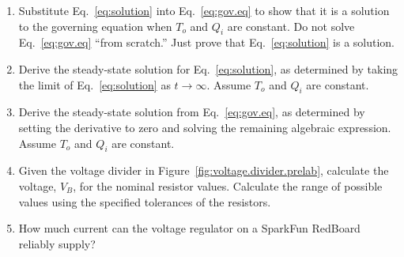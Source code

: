 \documentclass[11pt]{article} %
\begin{document}
\begin{enumerate}
\item Substitute Eq.~\ref{eq:solution} into Eq.~\ref{eq:gov.eq} to show that it is a solution to the governing equation when $T_{o}$ and $Q_{i}$ are constant. Do not solve Eq.~\ref{eq:gov.eq} ``from scratch.'' Just prove that Eq.~\ref{eq:solution} is a solution.
\vspace{1.5in}
\item Derive the steady-state solution for Eq.~\ref{eq:solution}, as determined by taking the limit of Eq.~\ref{eq:solution} as $t\rightarrow\infty$. Assume $T_{o}$ and $Q_{i}$ are constant.
\vspace{1.5in}
\item Derive the steady-state solution from Eq.~\ref{eq:gov.eq}, as determined by setting the derivative to zero and solving the remaining algebraic expression. Assume $T_{o}$ and $Q_{i}$ are constant.
\vspace{1.5in}
\item Given the voltage divider in Figure~\ref{fig:voltage.divider.prelab}, calculate the voltage, $V_B$, for the nominal resistor values. Calculate the range of possible values using the specified tolerances of the resistors.
\vspace{1.5in}
\item How much current can the voltage regulator on a SparkFun RedBoard reliably supply?
\vspace{1.5in}
\begin{figure}[htbp]
\begin{center}

\end{center}
\end{figure}
\end{enumerate}
\end{document}
